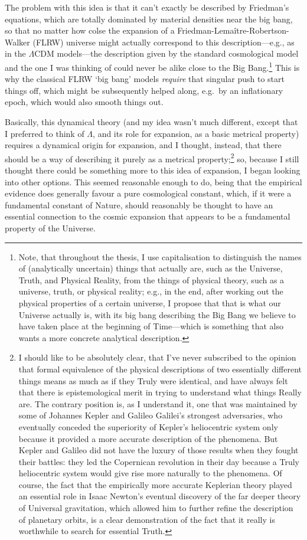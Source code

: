 The problem with this idea is that it can't exactly be described by Friedman's equations, which are totally dominated by material densities near the big bang, so that no matter how colse the expansion of a Friedman-Lema\^{i}tre-Robertson-Walker (FLRW) universe might actually correspond to this description---e.g., as in the $\Lambda$CDM models---the description given by the standard cosmological model and the one I was thinking of could never be alike close to the Big Bang.\footnote{Note, that throughout the thesis, I use capitalisation to distinguish the names of (analytically uncertain) things that actually are, such as the Universe, Truth, and Physical Reality, from the things of physical theory, such as a universe, truth, or physical reality; e.g., in the end, after working out the physical properties of a certain universe, I propose that that is what our Universe actually is, with its big bang describing the Big Bang we believe to have taken place at the beginning of Time---which is something that also wants a more concrete analytical description.} This is why the classical FLRW `big bang' models \textit{require} that singular push to start things off, which might be subsequently helped along, e.g.~by an inflationary epoch, which would also smooth things out. 

Basically, this dynamical theory (and my idea wasn't much different, except that I preferred to think of $\Lambda$, and its role for expansion, as a basic metrical property) requires a dynamical origin for expansion, and I thought, instead, that there should be a way of describing it purely as a metrical property;\footnote{I should like to be absolutely clear, that I've never subscribed to the opinion that formal equivalence of the physical descriptions of two essentially different things means as much as if they Truly were identical, and have always felt that there is epistemological merit in trying to understand what things Really are. The contrary position is, as I understand it, one that was maintained by some of Johannes Kepler and Galileo Galilei's strongest adversaries, who eventually conceded the superiority of Kepler's heliocentric system only because it provided a more accurate description of the phenomena. But Kepler and Galileo did not have the luxury of those results when they fought their battles: they led the Copernican revolution in their day because a Truly heliocentric system would give rise more naturally to the phenomena. Of course, the fact that the empirically more accurate Keplerian theory played an essential role in Isaac Newton's eventual discovery of the far deeper theory of Universal gravitation, which allowed him to further refine the description of planetary orbits, is a clear demonstration of the fact that it really is worthwhile to search for essential Truth.} so, because I still thought there could be something more to this idea of expansion, I began looking into other options. This seemed reasonable enough to do, being that the empirical evidence does generally favour a pure cosmological constant, which, if it were a fundamental constant of Nature, should reasonably be thought to have an essential connection to the cosmic expansion that appears to be a fundamental property of the Universe.

